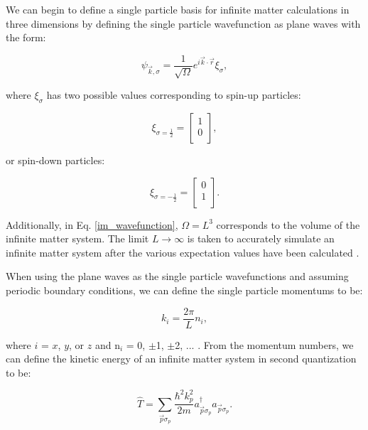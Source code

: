 We can begin to define a single particle basis for infinite matter calculations in three dimensions by defining the single particle wavefunction as plane waves with the form:

\begin{equation} \label{im_wavefunction}
	\psi_{\vec{k},\sigma} = \frac{1}{\sqrt{\Omega}} e^{i\vec{k}\cdot\vec{r}}\xi_\sigma,
\end{equation}

where $\xi_\sigma$ has two possible values corresponding to spin-up particles:

\begin{equation} \label{spin_up}
	\xi_{\sigma=\frac{1}{2}} = \begin{bmatrix}
									1 \\
									0 \\
								\end{bmatrix},
\end{equation}

or spin-down particles: 

\begin{equation} \label{spin_down}
	\xi_{\sigma=-\frac{1}{2}} = \begin{bmatrix}
									0 \\
									1 \\
								\end{bmatrix}.
\end{equation}


Additionally, in Eq. \ref{im_wavefunction}, $\Omega = L^3$ corresponds to the volume of the infinite matter system. The limit $L \rightarrow \infty$ is taken to accurately simulate an infinite matter system after the various expectation values have been calculated \cite{Ref3, Ref13, Ref1}.

When using the plane waves as the single particle wavefunctions and assuming periodic boundary conditions, we can define the single particle momentums to be:

\begin{equation} \label{sp_momentum}
	k_i = \frac{2\pi}{L}n_i,
\end{equation}

where $i$ = $x$, $y$, or $z$ and n$_i$ = 0, $\pm$1, $\pm$2, ... \cite{Ref3, Ref1}.  From the momentum numbers, we can define the kinetic energy of an infinite matter system in second quantization to be:

\begin{equation} \label{im_kinetic}
	\hat{T} = \sum_{\vec{p}\sigma_p} \frac{\hbar^2k_p^2}{2m}a^\dagger_{\vec{p}\sigma_p}a_{\vec{p}\sigma_p}.
\end{equation}

